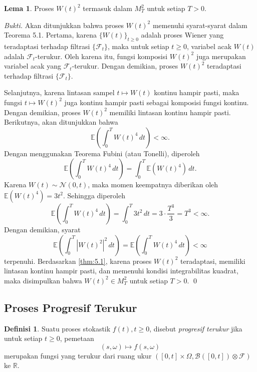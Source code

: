 \documentclass[aspectratio=169,11pt]{beamer}
\theoremstyle{definition}
\newtheorem{definisi}{Definisi}
\newtheorem{lema}{Lema}
\newcommand{\myref}[1]{\hyperref[#1]{\nameCref{#1} \ref*{#1}}}
\begin{document}
\begin{frame}[allowframebreaks]{\insertsection}{\insertsubsection}
  \begin{lema}\label{lem:5.7}
    Proses $W(t)^2$ termasuk dalam $M_T^2$ untuk setiap $T > 0$.
  \end{lema}
  \textit{Bukti.} Akan ditunjukkan bahwa proses $W(t)^2$ memenuhi syarat-syarat dalam Teorema 5.1. Pertama, karena $\{W(t)\}_{t \ge 0}$ adalah proses Wiener yang teradaptasi terhadap filtrasi $\{\mathcal{F}_t\}$, maka untuk setiap $t \ge 0$, variabel acak $W(t)$ adalah $\mathcal{F}_t$-terukur. Oleh karena itu, fungsi komposisi $W(t)^2$ juga merupakan variabel acak yang $\mathcal{F}_t$-terukur. Dengan demikian, proses $W(t)^2$ teradaptasi terhadap filtrasi $\{\mathcal{F}_t\}$.

  Selanjutnya, karena lintasan sampel $t \mapsto W(t)$ kontinu hampir pasti, maka fungsi $t \mapsto W(t)^2$ juga kontinu hampir pasti sebagai komposisi fungsi kontinu. Dengan demikian, proses $W(t)^2$ memiliki lintasan kontinu hampir pasti. Berikutnya, akan ditunjukkan bahwa
  \begin{equation*}
    \mathbb{E}\left( \int_0^T W(t)^4 \, dt \right) < \infty.
  \end{equation*}
  Dengan menggunakan Teorema Fubini (atau Tonelli), diperoleh
  \begin{equation*}
    \mathbb{E}\left( \int_0^T W(t)^4 \, dt \right) = \int_0^T \mathbb{E}(W(t)^4) \, dt.
  \end{equation*}
  Karena $W(t) \sim \mathcal{N}(0, t)$, maka momen keempatnya diberikan oleh $\mathbb{E}(W(t)^4) = 3t^2$.
  Sehingga diperoleh
  \begin{equation*}
    \mathbb{E}\left( \int_0^T W(t)^4 \, dt \right) = \int_0^T 3t^2 \, dt = 3 \cdot \frac{T^3}{3} = T^3 < \infty.
  \end{equation*}
  Dengan demikian, syarat
  \begin{equation*}
    \mathbb{E}\left( \int_0^T |W(t)^2|^2 \, dt \right) = \mathbb{E}\left( \int_0^T W(t)^4 \, dt \right) < \infty
  \end{equation*}
  terpenuhi. Berdasarkan \myref{thm:5.1}, karena proses $W(t)^2$ teradaptasi, memiliki lintasan kontinu hampir pasti, dan memenuhi kondisi integrabilitas kuadrat, maka disimpulkan bahwa $W(t)^2 \in M_T^2$ untuk setiap $T > 0$. \qed
\end{frame}

\subsection{Proses Progresif Terukur}
\begin{frame}{\insertsection}{\insertsubsection}
  \begin{definisi}
    Suatu proses stokastik $f(t), t \ge 0$, disebut \textit{progresif terukur} jika untuk setiap $t \ge 0$, pemetaan
    \begin{equation*}
      (s, \omega) \mapsto f(s, \omega)
    \end{equation*}
    merupakan fungsi yang terukur dari ruang ukur $([0, t] \times \Omega, \mathcal{B}([0, t]) \otimes \mathcal{F})$ ke $\mathbb{R}$.
  \end{definisi}
\end{frame}
\end{document}
